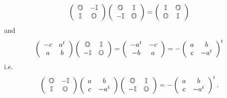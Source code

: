 \documentclass[aps,preprint]{revtex4}%
\begin{document}
\begin{equation}
\left(
\begin{array}
[c]{cc}%
\mathbb{O} & \mathbb{-I}\\
\mathbb{I} & \mathbb{O}%
\end{array}
\right)  \left(
\begin{array}
[c]{cc}%
\mathbb{O} & \mathbb{I}\\
-\mathbb{I} & \mathbb{O}%
\end{array}
\right)  =\left(
\begin{array}
[c]{cc}%
\mathbb{I} & \mathbb{O}\\
\mathbb{O} & \mathbb{I}%
\end{array}
\right)
\end{equation}
and%
\begin{equation}
\left(
\begin{array}
[c]{cc}%
-c & a^{t}\\
a & b
\end{array}
\right)  \left(
\begin{array}
[c]{cc}%
\mathbb{O} & \mathbb{I}\\
-\mathbb{I} & \mathbb{O}%
\end{array}
\right)  =\left(
\begin{array}
[c]{cc}%
-a^{t} & -c\\
-b & a
\end{array}
\right)  =-\left(
\begin{array}
[c]{cc}%
a & b\\
c & -a^{t}%
\end{array}
\right)  ^{t}%
\end{equation}
i.e.
\begin{equation}
\left(
\begin{array}
[c]{cc}%
\mathbb{O} & \mathbb{-I}\\
\mathbb{I} & \mathbb{O}%
\end{array}
\right)  \left(
\begin{array}
[c]{cc}%
a & b\\
c & -a^{t}%
\end{array}
\right)  \left(
\begin{array}
[c]{cc}%
\mathbb{O} & \mathbb{I}\\
-\mathbb{I} & \mathbb{O}%
\end{array}
\right)  =-\left(
\begin{array}
[c]{cc}%
a & b\\
c & -a^{t}%
\end{array}
\right)  ^{t}.
\end{equation}
\end{document}
